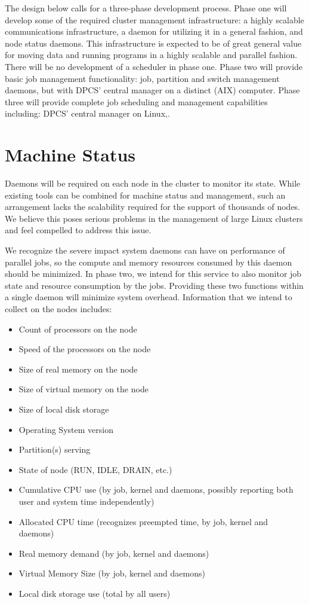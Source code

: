 The design below calls for a three-phase development process. Phase one will
develop some of the required cluster management infrastructure: a highly
scalable communications infrastructure, a daemon for utilizing it in a general
fashion, and node status daemons. This infrastructure is expected to be of
great general value for moving data and running programs in a highly scalable
and parallel fashion. There will be no development of a scheduler in phase one.
Phase two will provide basic job management functionality: job, partition and
switch management daemons, but with DPCS' central manager on a distinct (AIX)
computer. Phase three will provide complete job scheduling and management
capabilities including: DPCS' central manager on Linux,.



\section{Machine Status}

Daemons will be required on each node in the cluster to monitor its state.
While existing tools can be combined for machine status and management, such an
arrangement lacks the scalability required for the support of thousands of
nodes. We believe this poses serious problems in the management of large Linux
clusters and feel compelled to address this issue. 

We recognize the severe impact system daemons can have on performance of
parallel jobs, so the compute and memory resources consumed by this daemon
should be minimized. In phase two, we intend for this service to also monitor
job state and resource consumption by the jobs. Providing these two functions
within a single daemon will minimize system overhead. Information that we
intend to collect on the nodes includes:

\begin{itemize}
\item Count of processors on the node
\item Speed of the processors on the node
\item Size of real memory on the node
\item Size of virtual memory on the node
\item Size of local disk storage
\item Operating System version
\item Partition(s) serving
\item State of node (RUN, IDLE, DRAIN, etc.)
\item Cumulative CPU use (by job, kernel and daemons, possibly reporting 
both user and system time independently)
\item Allocated CPU time (recognizes preempted time, by job, kernel and daemons)
\item Real memory demand (by job, kernel and daemons)
\item Virtual Memory Size (by job, kernel and daemons)
\item Local disk storage use (total by all users)
\end{itemize}

